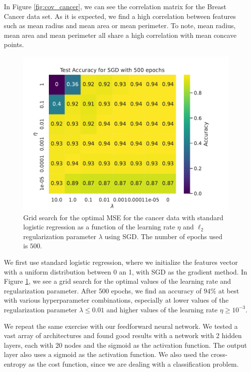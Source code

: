 \documentclass[aps,reprint,superscriptaddress,nofootinbib]{revtex4-2}
\begin{document}
In Figure \ref{fig:cov_cancer}, we can see the correlation matrix for the Breast Cancer data set. As it is expected, we find a high correlation between features such as mean radius and mean area or mean perimeter. To note, mean radius, mean area and mean perimeter all share a high correlation with mean concave points.

\begin{figure}[htp]
    \centering
    \includegraphics[width=\linewidth]{part_e/1_cancer_log_reg_500_epochs.pdf}
    \caption{Grid search for the optimal MSE for the cancer data with standard logistic regression as a function of the learning rate \(\eta\) and \(\ell_2\) regularization parameter \(\lambda\) using SGD. The number of epochs used is \(500\).}
    \label{fig:gs_log_reg_cancer}
\end{figure}

We first use standard logistic regression, where we initialize the features vector with a uniform distribution between 0 an 1, with SGD as the gradient method. In Figure \ref{fig:gs_log_reg_cancer}, we see a grid search for the optimal values of the learning rate and regularization parameter. After 500 epochs, we find an accuracy of \(94\%\) at best with various hyperparameter combinations, especially at lower values of the regularization parameter \(\lambda \leq 0.01\) and higher values of the learning rate \(\eta \geq 10^{-3}\).

We repeat the same exercise with our feedforward neural network. We tested a vast array of architectures and found good results with a network with 2 hidden layers, each with 20 nodes and the sigmoid as the activation function. The output layer also uses a sigmoid as the activation function. We also used the cross-entropy as the cost function, since we are dealing with a classification problem.
\end{document}
